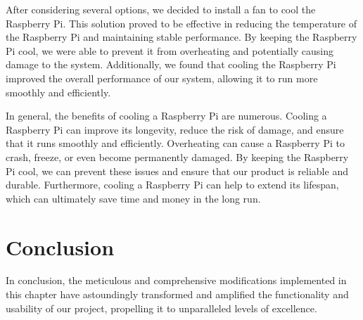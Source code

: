 After considering several options, we decided to install a fan to cool the Raspberry Pi. This solution proved to be effective in reducing the temperature of the Raspberry Pi and maintaining stable performance. By keeping the Raspberry Pi cool, we were able to prevent it from overheating and potentially causing damage to the system. Additionally, we found that cooling the Raspberry Pi improved the overall performance of our system, allowing it to run more smoothly and efficiently.

In general, the benefits of cooling a Raspberry Pi are numerous. Cooling a Raspberry Pi can improve its longevity, reduce the risk of damage, and ensure that it runs smoothly and efficiently. Overheating can cause a Raspberry Pi to crash, freeze, or even become permanently damaged. By keeping the Raspberry Pi cool, we can prevent these issues and ensure that our product is reliable and durable. Furthermore, cooling a Raspberry Pi can help to extend its lifespan, which can ultimately save time and money in the long run.
\section{Conclusion} 
In conclusion, the meticulous and comprehensive modifications implemented in this chapter have astoundingly transformed and amplified the functionality and usability of our project, propelling it to unparalleled levels of excellence.

%




%